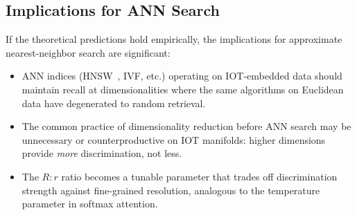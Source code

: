 \subsection{Implications for ANN Search}

If the theoretical predictions hold empirically, the implications for approximate nearest-neighbor search are significant:
\begin{itemize}
    \item ANN indices (HNSW~\cite{malkov2018hnsw}, IVF, etc.) operating on IOT-embedded data should maintain recall at dimensionalities where the same algorithms on Euclidean data have degenerated to random retrieval.
    \item The common practice of dimensionality reduction before ANN search may be unnecessary or counterproductive on IOT manifolds: higher dimensions provide \emph{more} discrimination, not less.
    \item The $R{:}r$ ratio becomes a tunable parameter that trades off discrimination strength against fine-grained resolution, analogous to the temperature parameter in softmax attention.
\end{itemize}
